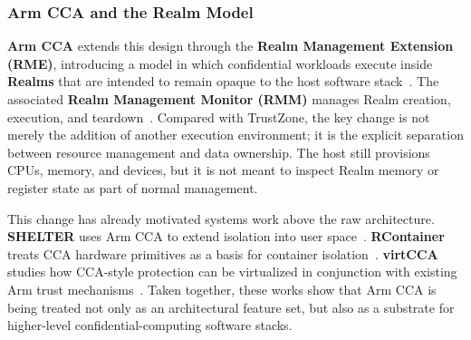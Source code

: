 \subsubsection{Arm CCA and the Realm Model}

\textbf{Arm CCA} extends this design through the \textbf{Realm Management Extension (RME)}, introducing a model in which confidential workloads execute inside \textbf{Realms} that are intended to remain opaque to the host software stack~\cite{li2022cca,arm_cca_spec,arm_rme_spec}. The associated \textbf{Realm Management Monitor (RMM)} manages Realm creation, execution, and teardown~\cite{arm_rmm_spec,wu2024rmm}. Compared with TrustZone, the key change is not merely the addition of another execution environment; it is the explicit separation between resource management and data ownership. The host still provisions CPUs, memory, and devices, but it is not meant to inspect Realm memory or register state as part of normal management.

This change has already motivated systems work above the raw architecture. \textbf{SHELTER} uses Arm CCA to extend isolation into user space~\cite{zhang2023shelter}. \textbf{RContainer} treats CCA hardware primitives as a basis for container isolation~\cite{zhou2025rcontainer}. \textbf{virtCCA} studies how CCA-style protection can be virtualized in conjunction with existing Arm trust mechanisms~\cite{xu2026virtcca}. Taken together, these works show that Arm CCA is being treated not only as an architectural feature set, but also as a substrate for higher-level confidential-computing software stacks.

